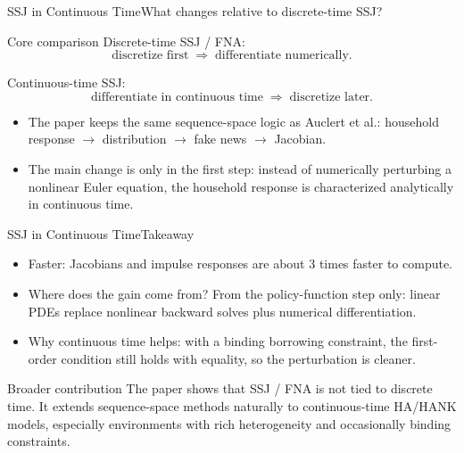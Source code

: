 \documentclass[aspectratio=169]{beamer}
\begin{document}
\begin{frame}{SSJ in Continuous Time}{What changes relative to discrete-time SSJ?}
\small

\begin{block}{Core comparison}
Discrete-time SSJ / FNA:
\[
\text{discretize first} \;\Longrightarrow\; \text{differentiate numerically}.
\]

Continuous-time SSJ:
\[
\text{differentiate in continuous time} \;\Longrightarrow\; \text{discretize later}.
\]
\end{block}

\begin{itemize}
    \item The paper keeps the \alert{same sequence-space logic} as Auclert et al.:
    household response $\rightarrow$ distribution $\rightarrow$ fake news $\rightarrow$ Jacobian.
    \item The main change is only in the \alert{first step}:
    instead of numerically perturbing a nonlinear Euler equation,
    the household response is characterized analytically in continuous time.
\end{itemize}

\end{frame}


\begin{frame}{SSJ in Continuous Time}{Takeaway \cite{bilal2025some}}
\small

\begin{itemize}
    \item \alert{Faster}: Jacobians and impulse responses are about \alert{3 times faster} to compute.
    \item \alert{Where does the gain come from?}  
    From the policy-function step only:
    linear PDEs replace nonlinear backward solves plus numerical differentiation.
    \item \alert{Why continuous time helps}: with a binding borrowing constraint,
    the first-order condition still holds with equality, so the perturbation is cleaner.
\end{itemize}

\begin{alertblock}{Broader contribution}
The paper shows that SSJ / FNA is not tied to discrete time.  
It extends sequence-space methods naturally to \alert{continuous-time HA/HANK models},
especially environments with rich heterogeneity and occasionally binding constraints.
\end{alertblock}

\end{frame}
\end{document}
